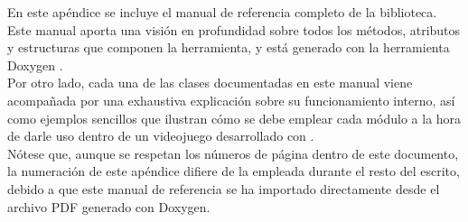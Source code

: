 



En este apéndice se incluye el manual de referencia completo de la biblioteca. Este manual aporta una visión en profundidad sobre todos los métodos, atributos y estructuras que componen la herramienta, y está generado con la herramienta Doxygen \cite{website:doxygen}.\\

Por otro lado, cada una de las clases documentadas en este manual viene acompañada por una exhaustiva explicación sobre su funcionamiento interno, así como ejemplos sencillos que ilustran cómo se debe emplear cada módulo a la hora de darle uso dentro de un videojuego desarrollado con .\\

Nótese que, aunque se respetan los números de página dentro de este documento, la numeración de este apéndice difiere de la empleada durante el resto del escrito, debido a que este manual de referencia se ha importado directamente desde el archivo PDF generado con Doxygen.



